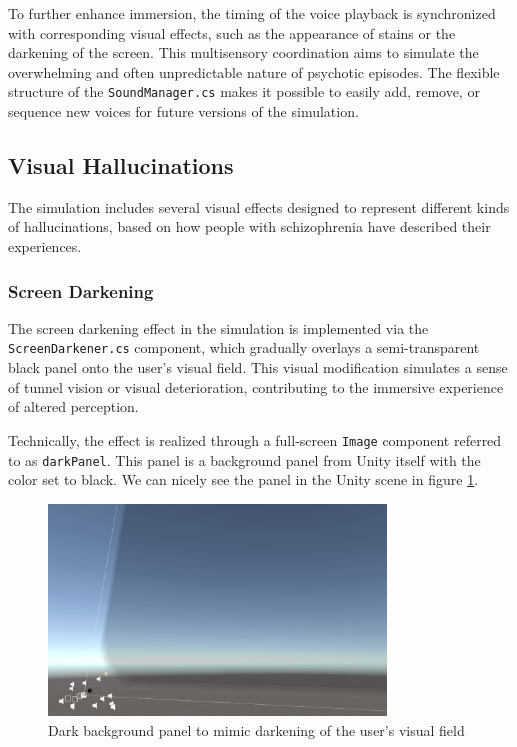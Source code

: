 \vspace{1em}
To further enhance immersion, the timing of the voice playback is synchronized with corresponding visual effects, such as the appearance of stains or the darkening of the screen. This multisensory coordination aims to simulate the overwhelming and often unpredictable nature of psychotic episodes. The flexible structure of the \texttt{SoundManager.cs} makes it possible to easily add, remove, or sequence new voices for future versions of the simulation.

\subsection{Visual Hallucinations}

The simulation includes several visual effects designed to represent different kinds of hallucinations, based on how people with schizophrenia have described their experiences. 

\subsubsection{Screen Darkening}

The screen darkening effect in the simulation is implemented via the \texttt{ScreenDarkener.cs} component, which gradually overlays a semi-transparent black panel onto the user's visual field. This visual modification simulates a sense of tunnel vision or visual deterioration, contributing to the immersive experience of altered perception.

Technically, the effect is realized through a full-screen \texttt{Image} component referred to as \texttt{darkPanel}. This panel is a background panel from Unity itself with the color set to black. We can nicely see the panel in the Unity scene in figure \ref{fig:darkpanel}. 

\begin{figure}[h!] 
    \centering 
    \includegraphics[width=0.8\textwidth]{../../Figures/darkpanel.jpg} 
    \caption{Dark background panel to mimic darkening of the user's visual field} 
    \label{fig:darkpanel} 
\end{figure}

